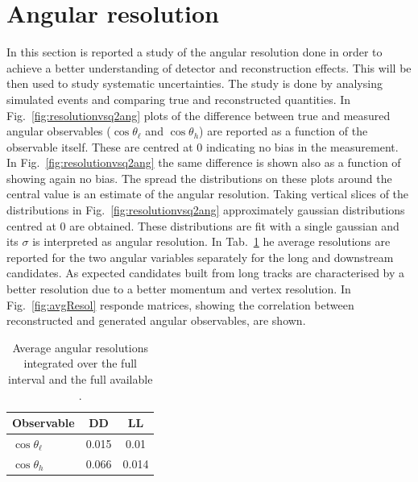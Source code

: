 \section{Angular resolution}
\label{sec:and_resolution}

In this section is reported a study of the angular resolution done in order to achieve a better understanding
of detector and reconstruction effects. This will be then used to study systematic uncertainties.
The study is done by analysing simulated events and comparing true and reconstructed quantities.
In Fig.~\ref{fig:resolutionvsq2ang} plots of the difference between true and measured angular observables 
($\cos \theta_\ell$ and $\cos \theta_h$)  are reported as a function of the observable itself.
These are centred at 0 indicating no bias in the measurement.
In Fig.~\ref{fig:resolutionvsq2ang} the same difference is shown also as a function of \qsq showing again no bias.
The spread the distributions on these plots around the central value is an estimate of the angular resolution.
Taking vertical slices of the distributions in Fig.~\ref{fig:resolutionvsq2ang} approximately gaussian
distributions centred at 0 are obtained. These distributions are fit with a single gaussian and its $\sigma$
is interpreted as angular resolution. In Tab.~\ref{tab:resolutions} he average resolutions are reported
for the two angular variables separately for the long and downstream candidates. As expected candidates built
from long tracks are characterised by a better resolution due to a better momentum and vertex resolution.
In Fig.~\ref{fig:avgResol} responde matrices, showing the correlation between reconstructed and
generated angular observables, are shown.

\begin{table}[b]
\centering
\caption{Average angular resolutions integrated over the full interval and the full available \qsq.}
\begin{tabular}{l|cc} \hline
Observable      & DD & LL     \\ \hline
$\cos \theta_\ell$ & 0.015 & 0.01 \\
$\cos \theta_h$ & 0.066 & 0.014 \\
\end{tabular}
\label{tab:resolutions}
\end{table}


